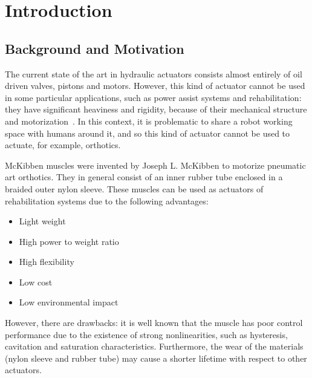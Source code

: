 
\chapter{Introduction}
\label{ch:introduction} %


\section{Background and Motivation}

The current state of the art in hydraulic actuators consists almost entirely of
oil driven valves, pistons and motors. However, this kind of actuator cannot be 
used in some particular applications, such as power assist systems and rehabilitation:
they have significant heaviness and rigidity, because of their mechanical structure and
motorization~\cite{mckibben_tondu}. 
In this context, it is problematic to share a robot working space with humans around it, 
and so this kind of actuator cannot be used to actuate, for example, orthotics.

McKibben muscles were invented by Joseph L. McKibben to motorize pneumatic art orthotics.
They in general consist of an inner rubber tube enclosed in a braided outer nylon sleeve.
These muscles can be used as actuators of rehabilitation systems due to the following advantages:

\begin{itemize}[noitemsep]
	\item Light weight
	\item High power to weight ratio
	\item High flexibility
	\item Low cost
	\item Low environmental impact
\end{itemize}

However, there are drawbacks: it is well known that the muscle has poor control performance
due to the existence of strong nonlinearities, such as hysteresis,
cavitation and saturation characteristics.
Furthermore, the wear of the materials (nylon sleeve and rubber tube) may cause a shorter lifetime with respect to
other actuators.


